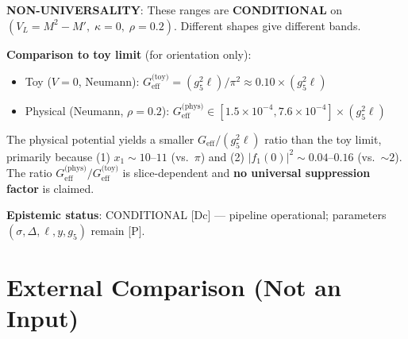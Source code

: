 \textbf{NON-UNIVERSALITY}: These ranges are \textbf{CONDITIONAL} on
$(V_L = M^2 - M',\; \kappa = 0,\; \rho = 0.2)$. Different shapes give different bands.

\textbf{Comparison to toy limit} (for orientation only):
\begin{itemize}
    \item Toy ($V=0$, Neumann): $G_{\text{eff}}^{\text{(toy)}} = (g_5^2 \ell) / \pi^2 \approx 0.10 \times (g_5^2 \ell)$
    \item Physical (Neumann, $\rho=0.2$): $G_{\text{eff}}^{\text{(phys)}} \in [1.5 \times 10^{-4}, 7.6 \times 10^{-4}] \times (g_5^2 \ell)$
\end{itemize}

The physical potential yields a smaller $G_{\text{eff}}/(g_5^2\ell)$ ratio than the toy limit,
primarily because (1) $x_1 \sim 10$--$11$ (vs.\ $\pi$) and (2) $|f_1(0)|^2 \sim 0.04$--$0.16$ (vs.\ $\sim 2$).
The ratio $G_{\text{eff}}^{\text{(phys)}}/G_{\text{eff}}^{\text{(toy)}}$ is slice-dependent and
\textbf{no universal suppression factor} is claimed.

\textbf{Epistemic status}: CONDITIONAL [Dc] --- pipeline operational; parameters
$(\sigma, \Delta, \ell, y, g_5)$ remain [P].


\section{External Comparison (Not an Input)}
\label{sec:ch19_comparison}

